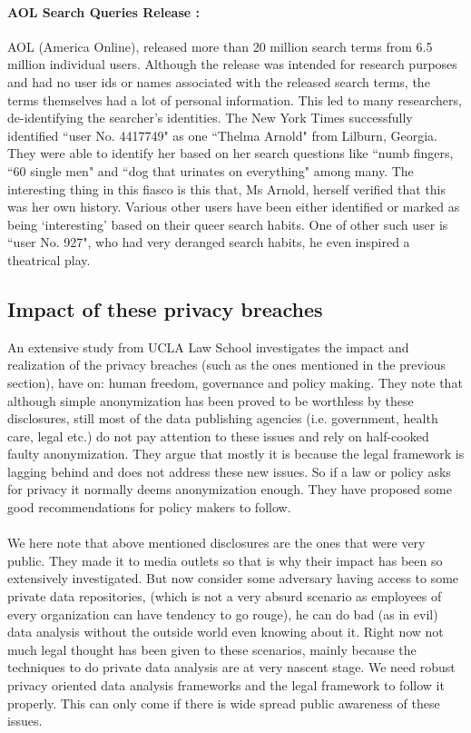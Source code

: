 \documentclass[12pt]{report}
\theoremstyle{named}
\begin{document}
\paragraph{AOL Search Queries Release \cite{barbaro2006face}:\\}
AOL (America Online), released more than 20 million search terms from 6.5 million individual users. Although the release was intended for research purposes and had no user ids or names associated with the released search terms, the terms themselves had a lot of personal information. This led to many researchers, de-identifying the searcher's identities. The New York Times successfully identified ``user No. 4417749" as one ``Thelma Arnold" from Lilburn, Georgia. They were able to identify her based on her search questions like ``numb fingers, ``60 single men" and ``dog that urinates on everything" among many. The interesting thing in this fiasco is this that, Ms Arnold, herself verified that this was her own history. Various other users have been either identified or marked as being `interesting' based on their queer search habits. One of other such user is ``user No. 927", who had very deranged search habits, he even inspired a theatrical play.


\subsection{Impact of these privacy breaches}
An extensive study \cite{ohm2009broken} from  UCLA Law School investigates the impact and realization of the privacy breaches (such as the ones mentioned in the previous section), have on: human freedom, governance and policy making. They note that although simple anonymization has been proved to be worthless by these disclosures, still most of the data publishing agencies (i.e. government, health care, legal etc.) do not pay attention to these issues and rely on half-cooked faulty anonymization. They argue that mostly it is because the legal framework is lagging behind and does not address these new issues. So if a law or policy asks for privacy it normally deems anonymization enough. They have proposed some good recommendations for policy makers to follow.

\paragraph{}
We here note that above mentioned disclosures are the ones that were very public. They made it to media outlets so that is why their impact has been so extensively investigated. But now consider some adversary having access to some private data repositories, (which is not a very absurd scenario as employees of every organization can have tendency to go rouge), he can do bad (as in evil) data analysis without the outside world even knowing about it. Right now not much legal thought has been given to these scenarios, mainly because the techniques to do private data analysis are at very nascent stage. We need robust privacy oriented data analysis frameworks and the legal framework to follow it properly. This can only come if there is wide spread public awareness of these issues.
\end{document}
